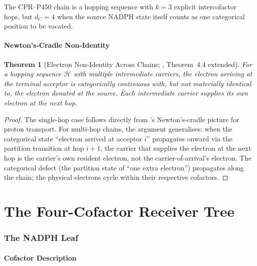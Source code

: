 \documentclass[11pt,twocolumn,a4paper]{article}
\newtheorem{theorem}{Theorem}[section]
\theoremstyle{definition}
\theoremstyle{remark}
\newcommand{\dC}{d_{\mathrm{C}}}
\begin{document}
The CPR--P450 chain is a hopping sequence with $k = 3$ explicit intercofactor
hops, but $\dC = 4$ when the source NADPH state itself counts as one
categorical position to be vacated.

\subsection{Newton's-Cradle Non-Identity}

\begin{theorem}[Electron Non-Identity Across Chains; \citealt{sachikonye2025_flux}, Theorem~4.4 extended]
\label{thm:electron_nonidentity}
For a hopping sequence $\mathcal{H}$ with multiple intermediate carriers,
the electron arriving at the terminal acceptor is categorically continuous
with, but not materially identical to, the electron donated at the source.
Each intermediate carrier supplies its own electron at the next hop.
\end{theorem}

\begin{proof}
The single-hop case follows directly from \citep{sachikonye2025_flux}'s
Newton's-cradle picture for proton transport. For multi-hop chains, the
argument generalises: when the categorical state ``electron arrived at
acceptor $i$'' propagates onward via the partition transition at hop $i+1$,
the carrier that supplies the electron at the next hop is the carrier's
own resident electron, not the carrier-of-arrival's electron. The
categorical defect (the partition state of ``one extra electron'')
propagates along the chain; the physical electrons cycle within their
respective cofactors.
\end{proof}

\part{The Four-Cofactor Receiver Tree}

\section{The NADPH Leaf}
\label{sec:nadph_leaf}

\subsection{Cofactor Description}
\end{document}
